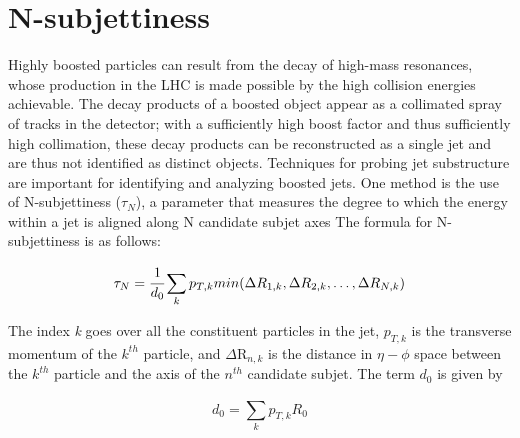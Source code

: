 \chapter{N-subjettiness\label{sec:nsubj}}

Highly boosted particles can result from the decay of high-mass resonances, whose production in the LHC is made possible by the high collision energies achievable. The decay products of a boosted object appear as a collimated spray of tracks in the detector; with a sufficiently high boost factor and thus sufficiently high collimation, these decay products can be reconstructed as a single jet and are thus not identified as distinct objects. Techniques for probing jet substructure are important for identifying and analyzing boosted jets. One method is the use of N-subjettiness ($\tau_{N}$), a parameter that measures the degree to which the energy within a jet is aligned along N candidate subjet axes\newline
The formula for N-subjettiness is as follows:

\begin{equation}
\tau_{N} = \cfrac{1}{d_{0}}\sum_{k}^{}p_{T,k}min(\Delta R_{1,k},\Delta R_{2,k},\dots,\Delta R_{N,k})
\label{eq:Nsubj}
\end{equation}

\noindent The index \emph{k} goes over all the constituent particles in the jet, $p_{T,k}$ is the transverse momentum of the $k^{th}$ particle, and $\Delta$R$_{n,k}$ is the distance in $\eta-\phi$ space between the $k^{th}$ particle and the axis of the $n^{th}$ candidate subjet. The term $d_{0}$ is given by

\begin{equation}
d_{0} = \sum_{k}^{}p_{T,k}R_0
\label{eq:d0}
\end{equation}

